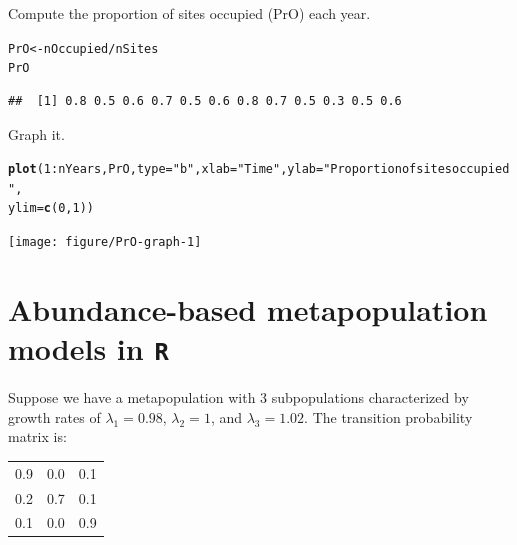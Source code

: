 \documentclass[12pt]{article}\usepackage[]{graphicx}\usepackage[]{xcolor}
\makeatletter
\newcommand{\hlnum}[1]{\textcolor[rgb]{0.686,0.059,0.569}{#1}}%
\newcommand{\hlsng}[1]{\textcolor[rgb]{0.192,0.494,0.8}{#1}}%
\newcommand{\hlopt}[1]{\textcolor[rgb]{0,0,0}{#1}}%
\newcommand{\hldef}[1]{\textcolor[rgb]{0.345,0.345,0.345}{#1}}%
\newcommand{\hlkwb}[1]{\textcolor[rgb]{0.69,0.353,0.396}{#1}}%
\newcommand{\hlkwc}[1]{\textcolor[rgb]{0.333,0.667,0.333}{#1}}%
\newcommand{\hlkwd}[1]{\textcolor[rgb]{0.737,0.353,0.396}{\textbf{#1}}}%
\newenvironment{kframe}{%
 \def\at@end@of@kframe{}%
 \ifinner\ifhmode%
  \def\at@end@of@kframe{\end{minipage}}%
  \begin{minipage}{\columnwidth}%
 \fi\fi%
 \def\FrameCommand##1{\hskip\@totalleftmargin \hskip-\fboxsep
 \colorbox{shadecolor}{##1}\hskip-\fboxsep
     \hskip-\linewidth \hskip-\@totalleftmargin \hskip\columnwidth}%
 \MakeFramed {\advance\hsize-\width
   \@totalleftmargin\z@ \linewidth\hsize
   \@setminipage}}%
 {\par\unskip\endMakeFramed%
 \at@end@of@kframe}
\newenvironment{knitrout}{}{} %
\makeatother
\begin{document}
\clearpage

Compute the proportion of sites occupied (PrO) each year.
\begin{knitrout}
\color{fgcolor}\begin{kframe}
\begin{alltt}
\hldef{PrO} \hlkwb{<-} \hldef{nOccupied} \hlopt{/} \hldef{nSites}
\hldef{PrO}
\end{alltt}
\begin{verbatim}
##  [1] 0.8 0.5 0.6 0.7 0.5 0.6 0.8 0.7 0.5 0.3 0.5 0.6
\end{verbatim}
\end{kframe}
\end{knitrout}

Graph it.
\begin{knitrout}
\color{fgcolor}\begin{kframe}
\begin{alltt}
\hlkwd{plot}\hldef{(}\hlnum{1}\hlopt{:}\hldef{nYears, PrO,} \hlkwc{type}\hldef{=}\hlsng{"b"}\hldef{,} \hlkwc{xlab}\hldef{=}\hlsng{"Time"}\hldef{,} \hlkwc{ylab}\hldef{=}\hlsng{"Proportion of sites occupied"}\hldef{,}
     \hlkwc{ylim}\hldef{=}\hlkwd{c}\hldef{(}\hlnum{0}\hldef{,} \hlnum{1}\hldef{))}
\end{alltt}
\end{kframe}
\texttt{[image: figure/PrO-graph-1]} 
\end{knitrout}


\clearpage

\section*{Abundance-based metapopulation models in \texttt{R}}

Suppose we have a metapopulation with 3 subpopulations characterized
by growth rates of $\lambda_1=0.98$, $\lambda_2=1$, and
$\lambda_3=1.02$. The transition probability matrix is:

\begin{table}[h!]
  \centering
  \begin{tabular}{ccc}
    \hline
    0.9 & 0.0 & 0.1 \\
    0.2 & 0.7 & 0.1 \\
    0.1 & 0.0 & 0.9 \\
    \hline
  \end{tabular}
\end{table}
\end{document}
